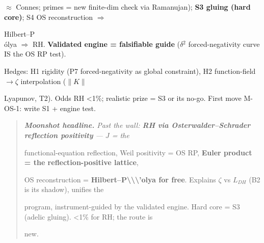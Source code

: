 \documentclass[10pt]{article}
\begin{document}
  \ensuremath{\approx} Connes; primes = new finite-dim check via Ramanujan); \textbf{S3 gluing (hard core)}; S4 OS reconstruction \ensuremath{\Rightarrow}\par
  Hilbert--P\\\'olya \ensuremath{\Rightarrow} RH. \textbf{Validated engine = falsifiable guide} (\ensuremath{\delta}\ensuremath{^2} forced-negativity curve IS the OS RP test).\par
  Hedges: H1 rigidity (P7 forced-negativity as global constraint), H2 function-field\ensuremath{\to}\ensuremath{\zeta} interpolation ($\|K\|$\par
  Lyapunov, T2). Odds RH <1\%; realistic prize = S3 or its no-go. First move M-OS-1: write S1 + engine test.\par

\begin{quote}\itshape
\textbf{Moonshot headline.} Past the wall: \textbf{RH via Osterwalder--Schrader reflection positivity} --- $J$ = the\par
functional-equation reflection, Weil positivity = OS RP, \textbf{Euler product = the reflection-positive lattice},\par
OS reconstruction = \textbf{Hilbert--P\textbackslash{}\textbackslash{}\textbackslash{}'olya for free}. Explains \ensuremath{\zeta} vs $L_{DH}$ (B2 is its shadow), unifies the\par
program, instrument-guided by the validated engine. Hard core = S3 (adelic gluing). <1\% for RH; the route is\par
new.\par
\end{quote}
\end{document}
